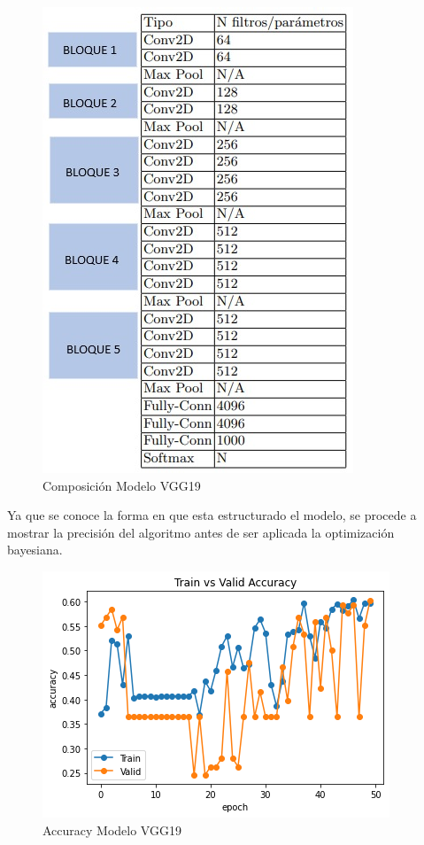 				\begin{figure}[ht]
					\centering
					\includegraphics[scale=0.3]{Figs/21.jpeg}
					\caption{Composición Modelo VGG19}
					\label{fig:VGG19_tabla}
				\end{figure}

				\newpage
				Ya que se conoce la forma en que esta estructurado el modelo, se procede a mostrar la precisión del algoritmo antes de ser aplicada la optimización bayesiana.
				
				\begin{figure}[ht]
					\centering
					\includegraphics[scale=0.55]{Figs/101.png}
					\caption{Accuracy Modelo VGG19}
					\label{fig:VGG19_accuracy}
				\end{figure}  
				
